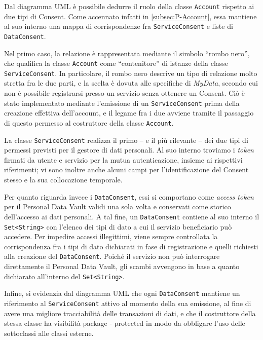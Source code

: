 Dal diagramma UML \`e possibile dedurre il ruolo della classe \texttt{Account} rispetto ai due tipi di Consent. Come accennato infatti in \ref{subsec:P-Account}, essa mantiene al suo interno una mappa di corrispondenze fra \texttt{ServiceConsent} e liste di \texttt{DataConsent}.

Nel primo caso, la relazione \`e rappresentata mediante il simbolo “rombo nero”, che qualifica la classe \texttt{Account} come “contenitore” di istanze della classe \texttt{ServiceConsent}. In particolare, il rombo nero descrive un tipo di relazione molto stretta fra le due parti, e la scelta \`e dovuta alle specifiche di \textit{MyData}, secondo cui non \`e possibile registrarsi presso un servizio senza ottenere un Consent. Ci\`o \`e stato implementato mediante l’emissione di un \texttt{ServiceConsent} prima della creazione effettiva dell’account, e il legame fra i due avviene tramite il passaggio di questo permesso al costruttore della classe \texttt{Account}.

La classe \texttt{ServiceConsent} realizza il primo – e il pi\`u rilevante – dei due tipi di permessi previsti per il gestore di dati personali. Al suo interno troviamo i \textit{token} firmati da utente e servizio per la mutua autenticazione, insieme ai rispettivi riferimenti; vi sono inoltre anche alcuni campi per l’identificazione del Consent stesso e la sua collocazione temporale.

Per quanto riguarda invece i \texttt{DataConsent}, essi si comportano come \textit{access token} per il Personal Data Vault validi una sola volta e conservati come storico dell’accesso ai dati personali. A tal fine, un \texttt{DataConsent} contiene al suo interno il \texttt{Set<String>} con l’elenco dei tipi di dato a cui il servizio beneficiario pu\`o accedere. Per impedire accessi illegittimi, viene sempre controllata la corrispondenza fra i tipi di dato dichiarati in fase di registrazione e quelli richiesti alla creazione del \texttt{DataConsent}. Poich\'e il servizio non pu\`o interrogare direttamente il Personal Data Vault, gli scambi avvengono in base a quanto dichiarato all’interno del \texttt{Set<String>}.

Infine, si evidenzia dal diagramma UML che ogni \texttt{DataConsent} mantiene un riferimento al \texttt{ServiceConsent} attivo al momento della sua emissione, al fine di avere una migliore tracciabilit\`a delle transazioni di dati, e che il costruttore della stessa classe ha visibilit\`a package - protected in modo da obbligare l’uso delle sottoclassi alle classi esterne.


